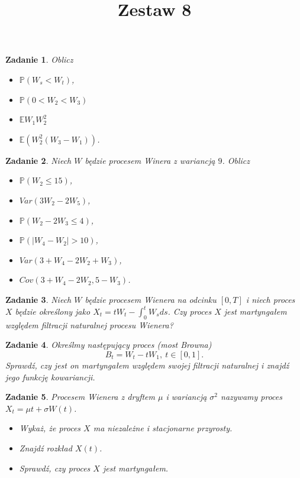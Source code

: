 \documentclass{mwart}
\title{Zestaw 8}
\newtheorem{zd}{Zadanie}
\begin{document}

\maketitle

\begin{zd}
	Oblicz
	\begin{itemize}
		\item $\mathbb{P}(W_s < W_t)$,
		\item $\mathbb{P}(0 < W_2 < W_3)$
		\item $\mathbb{E}W_1W_2^2$
		\item $\mathbb{E}\left(W_2^2(W_3 - W_1)\right)$.
	\end{itemize}
\end{zd}

\begin{zd}
Niech $W$ będzie procesem Winera z wariancją $9$. Oblicz
\begin{itemize}
\item $\mathbb{P}(W_2 \leq 15)$,
\item $Var(3W_2-2W_5)$,
\item $\mathbb{P}(W_2-2W_3\leq 4)$,
\item $\mathbb{P}(|W_4-W_2|> 10)$,
\item $Var(3+W_4-2W_2+W_3)$,
\item $Cov(3+W_4-2W_2, 5-W_3)$.
\end{itemize}
\end{zd}

\begin{zd}
Niech $W$ będzie procesem Wienera na odcinku $[0, T]$ i niech proces $X$ będzie określony jako $X_t = tW_t - \int_0^tW_sds$. Czy proces $X$ jest martyngałem względem filtracji naturalnej procesu Wienera?
\end{zd}

\begin{zd}
	Określmy następujący proces (most Browna)
	\begin{displaymath}
		B_t = W_t - tW_1, \ t\in[0,1].
	\end{displaymath}
	Sprawdź, czy jest on martyngałem względem swojej filtracji naturalnej i znajdź jego funkcję kowariancji.
\end{zd}

\begin{zd}
Procesem Wienera z dryftem $\mu$ i wariancją $\sigma^2$ nazywamy proces $X_t = \mu t+ \sigma W(t)$.
\begin{itemize}
\item Wykaż, że proces $X$ ma niezależne i stacjonarne przyrosty.
\item Znajdź rozkład $X(t)$.
\item Sprawdź, czy proces $X$ jest martyngałem.
\end{itemize}
\end{zd}
\end{document}
